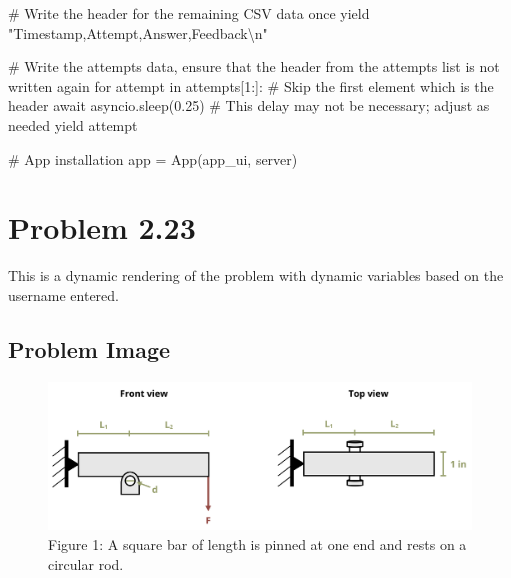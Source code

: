 \documentclass[
  letterpaper,
  DIV=11,
  numbers=noendperiod]{scrreprt}
\newenvironment{Shaded}{\begin{snugshade}}{\end{snugshade}}
\newcommand{\NormalTok}[1]{\textcolor[rgb]{0.00,0.23,0.31}{#1}}
\begin{document}
\begin{Shaded}
\begin{Highlighting}[]
\NormalTok{        \# Write the header for the remaining CSV data once}
\NormalTok{        yield "Timestamp,Attempt,Answer,Feedback\textbackslash{}n"}
        
\NormalTok{        \# Write the attempts data, ensure that the header from the attempts list is not written again}
\NormalTok{        for attempt in attempts[1:]:  \# Skip the first element which is the header}
\NormalTok{            await asyncio.sleep(0.25)  \# This delay may not be necessary; adjust as needed}
\NormalTok{            yield attempt}


\NormalTok{\# App installation}
\NormalTok{app = App(app\_ui, server)}
\end{Highlighting}
\end{Shaded}

\chapter*{Problem 2.23}\label{problem-2.23}


This is a dynamic rendering of the problem with dynamic variables based
on the username entered.

\section*{Problem Image}\label{problem-image-11}


\begin{figure}[H]

{\centering \includegraphics{images/168.png}

}

\caption{Figure 1: A square bar of length is pinned at one end and rests
on a circular rod.}

\end{figure}%
\end{document}
